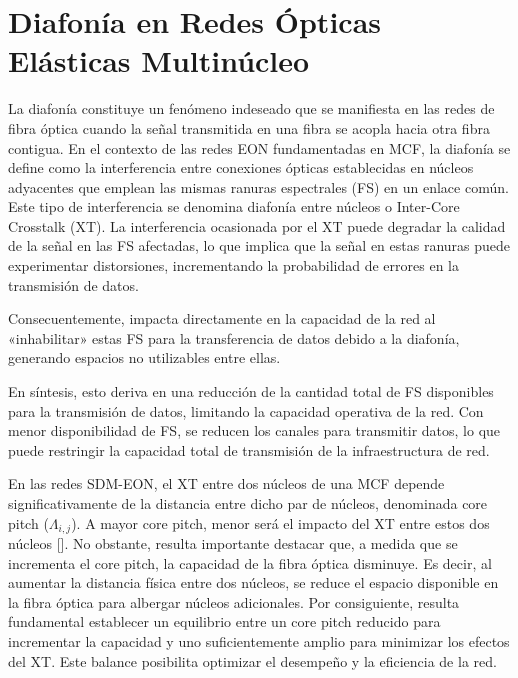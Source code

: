 \section{Diafonía en Redes Ópticas Elásticas Multinúcleo}
La diafonía constituye un fenómeno indeseado que se manifiesta en las redes de fibra óptica cuando la señal transmitida en una fibra se acopla hacia otra fibra contigua. En el contexto de las redes EON fundamentadas en MCF, la diafonía se define como la interferencia entre conexiones ópticas establecidas en núcleos adyacentes que emplean las mismas ranuras espectrales (FS) en un enlace común.
 Este tipo de interferencia se denomina diafonía entre núcleos o Inter-Core Crosstalk (XT). La interferencia ocasionada por el XT puede degradar la calidad de la señal en las FS afectadas, lo que implica que la señal en estas ranuras puede experimentar distorsiones, incrementando la probabilidad de errores en la transmisión de datos.
%
 
 Consecuentemente, impacta directamente en la capacidad de la red al «inhabilitar» estas FS para la transferencia de datos debido a la diafonía, generando espacios no utilizables entre ellas.
%

 En síntesis, esto deriva en una reducción de la cantidad total de FS disponibles para la transmisión de datos, limitando la capacidad operativa de la red. Con menor disponibilidad de FS, se reducen los canales para transmitir datos, lo que puede restringir la capacidad total de transmisión de la infraestructura de red.
%

 En las redes SDM-EON, el XT entre dos núcleos de una MCF depende significativamente de la distancia entre dicho par de núcleos, denominada core pitch ($\Lambda_{i,j}$). A mayor core pitch, menor será el impacto del XT entre estos dos núcleos [].
 No obstante, resulta importante destacar que, a medida que se incrementa el core pitch, la capacidad de la fibra óptica disminuye. Es decir, al aumentar la distancia física entre dos núcleos, se reduce el espacio disponible en la fibra óptica para albergar núcleos adicionales.
 Por consiguiente, resulta fundamental establecer un equilibrio entre un core pitch reducido para incrementar la capacidad y uno suficientemente amplio para minimizar los efectos del XT. Este balance posibilita optimizar el desempeño y la eficiencia de la red.


